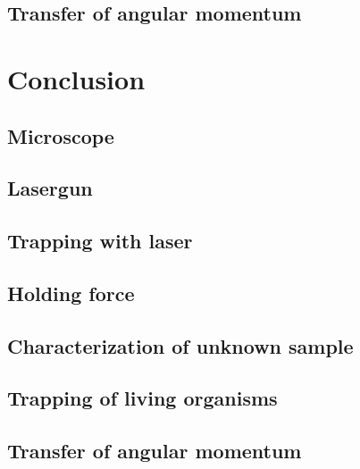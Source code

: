 \documentclass[12pt,english,ngerman]{scrartcl}
\begin{document}
\subsection{Transfer of angular momentum}




\section{Conclusion}\label{sec:zusammenfassung}

\subsection{Microscope}

\subsection{Lasergun}

\subsection{Trapping with laser}

\subsection{Holding force}

\subsection{Characterization of unknown sample}

\subsection{Trapping of living organisms}

\subsection{Transfer of angular momentum}

\newpage
\printbibliography
\listoffigures
\listoftables
\end{document}
